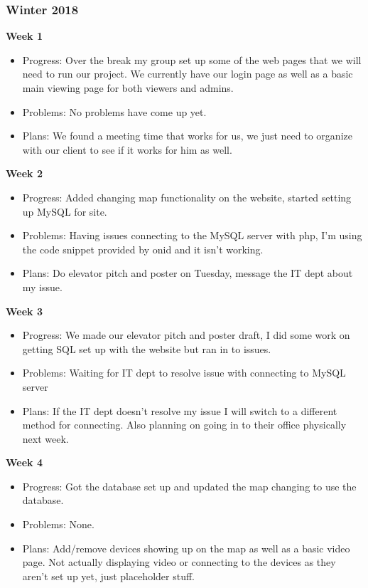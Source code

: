     \subsubsection{Winter 2018}
        \textbf{Week 1}
        \begin{itemize}
            \item Progress: Over the break my group set up some of the web pages that we will need to run our project. We currently have our login page as well as a basic main viewing page for both viewers and admins.

            \item Problems: No problems have come up yet.

            \item Plans: We found a meeting time that works for us, we just need to organize with our client to see if it works for him as well.
        \end{itemize}
        \textbf{Week 2}
        \begin{itemize}
            \item Progress: Added changing map functionality on the website, started setting up MySQL for site.

            \item Problems: Having issues connecting to the MySQL server with php, I'm using the code snippet provided by onid and it isn't working.

            \item Plans: Do elevator pitch and poster on Tuesday, message the IT dept about my issue.
        \end{itemize}
        \newpage
        \textbf{Week 3}
        \begin{itemize}
            \item Progress: We made our elevator pitch and poster draft, I did some work on getting SQL set up with the website but ran in to issues.

            \item Problems: Waiting for IT dept to resolve issue with connecting to MySQL server

            \item Plans: If the IT dept doesn't resolve my issue I will switch to a different method for connecting. Also planning on going in to their office physically next week.
        \end{itemize}
        \textbf{Week 4}
        \begin{itemize}
            \item Progress: Got the database set up and updated the map changing to use the database.

            \item Problems: None.

            \item Plans: Add/remove devices showing up on the map as well as a basic video page. Not actually displaying video or connecting to the devices as they aren't set up yet, just placeholder stuff.
        \end{itemize}
